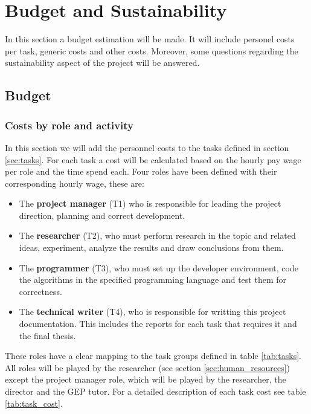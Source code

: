 
\chapter{Budget and Sustainability} %
\label{Chapter3}

In this section a budget estimation will be made. It will include personel costs per task, generic costs and other costs. Moreover, some questions regarding the sustainability aspect of the project will be answered.

\section{Budget}
\label{sec:budget}

\subsection{Costs by role and activity}

In this section we will add the personnel costs to the tasks defined in section \ref{sec:tasks}. For each task a cost will be calculated based on the hourly pay wage per role and the time spend each. Four roles have been defined with their corresponding hourly wage, these are:

\begin{itemize}
    \item The \textbf{project manager} (T1) who is responsible for leading the project direction, planning and correct development.
    \item The \textbf{researcher} (T2), who must perform research in the topic and related ideas, experiment, analyze the results and draw conclusions from them.
    \item The \textbf{programmer} (T3), who must set up the developer environment, code the algorithms in the specified programming language and test them for cor\-rect\-ness.
    \item The \textbf{technical writer} (T4), who is responsible for writting this project doc\-u\-men\-ta\-tion. This includes the reports for each task that requires it and the final thesis.
\end{itemize}

These roles have a clear mapping to the task groups defined in table \ref{tab:tasks}. All roles will be played by the researcher (see section \ref{sec:human_resources}) except the project manager role, which will be played by the researcher, the director and the GEP tutor. For a detailed description of each task cost see table \ref{tab:task_cost}.

